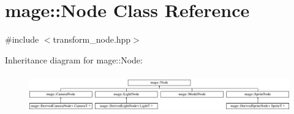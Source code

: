 \hypertarget{classmage_1_1_node}{}\section{mage\+:\+:Node Class Reference}
\label{classmage_1_1_node}


{\ttfamily \#include $<$transform\+\_\+node.\+hpp$>$}

Inheritance diagram for mage\+:\+:Node\+:\begin{figure}[H]
\begin{center}
\leavevmode
\includegraphics[height=1.680000cm]{classmage_1_1_node}
\end{center}
\end{figure}
